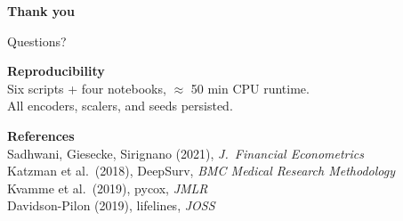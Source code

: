 \documentclass[10pt,aspectratio=169]{beamer}
\begin{document}
\begin{frame}[plain]
    \vspace*{1.5em}
    \begin{center}
        {\Huge \textbf{Thank you}}

        \vspace{1.5em}

        {\Large Questions?}

        \vspace{2.5em}

        \begin{minipage}{0.7\textwidth}
            \centering
            \small
            \textbf{Reproducibility}\\[0.3em]
            Six scripts + four notebooks, $\approx$ 50 min CPU runtime.\\
            All encoders, scalers, and seeds persisted.

            \vspace{1.5em}

            \textbf{References}\\[0.3em]
            Sadhwani, Giesecke, Sirignano (2021), \emph{J.\ Financial Econometrics} \\
            Katzman et al.\ (2018), DeepSurv, \emph{BMC Medical Research Methodology} \\
            Kvamme et al.\ (2019), pycox, \emph{JMLR} \\
            Davidson-Pilon (2019), lifelines, \emph{JOSS}
        \end{minipage}
    \end{center}
\end{frame}
\end{document}
